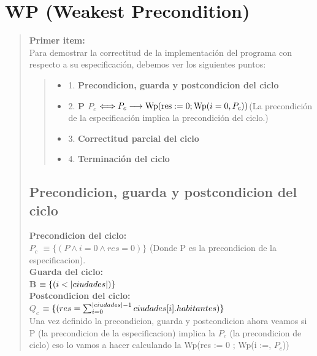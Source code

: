 \documentclass[10pt,a4paper]{article}
\begin{document}
\section{WP (Weakest Precondition)}
\begin{quote}
 \textbf{Primer item:} 
 \\
 Para demostrar la correctitud de la implementación del programa con respecto a su especificación, debemos ver los siguientes puntos:
 \begin{quote}
 \begin{itemize}
 	\item 1. \textbf{Precondicion, guarda y postcondicion del ciclo}
 	\item 2. \textbf{P \implica $P_c$} $\Longleftrightarrow P_c \longrightarrow \text{Wp}(\text{res} := 0; \text{Wp}(i = 0, P_c))$(La precondición de la especificación implica la precondición del ciclo.)
 	\item 3. \textbf{Correctitud parcial del ciclo} 
 	\item 4. \textbf{Terminación del ciclo} 
 \end{itemize}
 \end{quote}
 \subsection{Precondicion, guarda y postcondicion del ciclo}
 \textbf{Precondicion del ciclo:} \\ 
 \vspace{0.2cm}
 \textbf{$P_c$} $\equiv \{(P \land i = 0 \land res = 0)\}$ (Donde P es la precondicion de la especificacion).\\
 \vspace{0.2cm}
 \textbf{Guarda del ciclo:}\\ 
 \vspace{0.2cm}
 \textbf{B} $\equiv \{(i < |ciudades|)\}$ \\
 \vspace*{0.2cm}
 \textbf{Postcondicion del ciclo:} \\
 \vspace{0.2cm}
 \textbf{$Q_c$} $\equiv \{(res = \sum_{i=0}^{|ciudades|-1}ciudades[i].habitantes)\} $ \\ 
 \vspace{0.2cm}
 Una vez definido la precondicion, guarda y postcondicion ahora veamos si P (la precondicion de la especificacion) implica la $P_c$ (la precondicion de ciclo) eso lo vamos a hacer calculando la Wp(res := 0 ; Wp(i :=, $P_c$))

\end{quote}
\end{document}
